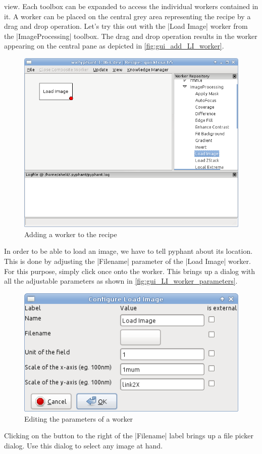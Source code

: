 \documentclass[a4paper]{article}
\begin{document}
view. Each toolbox can be expanded to access the individual workers
contained in it. A worker can be placed on the central grey area
representing the recipe by a drag and drop operation. Let's try this
out with the |Load Image| worker from the |ImageProcessing|
toolbox. The drag and drop operation results in the worker appearing
on the central pane as depicted in \autoref{fig:gui_add_LI_worker}.
\begin{figure}[h]
  \centering
  \includegraphics[scale=0.75]{fig/gui_add_LI_worker.png}
  \caption{Adding a worker to the recipe}
  \label{fig:gui_add_LI_worker}
\end{figure}
In order to be able to load an image, we have to tell pyphant about
its location. This is done by adjusting the |Filename| parameter of
the |Load Image| worker. For this purpose, simply click once onto the
worker. This brings up a dialog with all the adjustable parameters as
shown in \autoref{fig:gui_LI_worker_parameters}.
\begin{figure}[h]
  \centering
  \includegraphics[scale=0.75]{fig/gui_LI_worker_parameters.png}
  \caption{Editing the parameters of a worker}
  \label{fig:gui_LI_worker_parameters}
\end{figure}
Clicking on the button to the right of the |Filename| label brings up
a file picker dialog. Use this dialog to select any image at hand.
\end{document}
